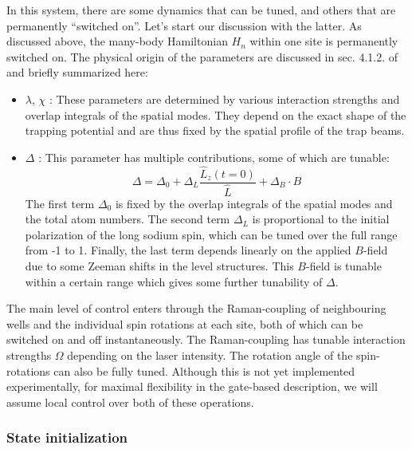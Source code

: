 \documentclass[a4paper, 10pt]{article}
\begin{document}
    In this system, there are some dynamics that can be tuned, and others that are permanently ``switched on''.
    Let's start our discussion with the latter. As discussed above, the many-body Hamiltonian $H_n$ within one site is permanently switched on.
    The physical origin of the parameters are discussed in sec. 4.1.2. of \cite{mil2020experimental} and briefly summarized here:
    
    \begin{itemize}
        \item $\lambda$, $\chi$ : These parameters are determined by various interaction strengths and overlap integrals of the spatial modes.
        They depend on the exact shape of the trapping potential and are thus fixed by the spatial profile of the trap beams.
        
        \item $\Delta$ : This parameter has multiple contributions, some of which are tunable:
        \begin{equation}
            \Delta = \Delta_0 + \Delta_L \frac{\hat{L}_z(t=0) }{\hat{L}} + \Delta_B \cdot B 
        \end{equation}
        The first term $\Delta_0$ is fixed by the overlap integrals of the spatial modes and the total atom numbers.
        The second term $\Delta_L$ is proportional to the initial polarization of the long sodium spin, which can be tuned over the full range from -1 to 1.
        Finally, the last term depends linearly on the applied $B$-field due to some Zeeman shifts in the level structures.
        This $B$-field is tunable within a certain range which gives some further tunability of $\Delta$.
        
        \end{itemize}
        
    The main level of control enters through the Raman-coupling of neighbouring wells and the individual spin rotations at each site, both of which can be switched on and off instantaneously. The Raman-coupling has tunable interaction strengths $\Omega$ depending on the laser intensity. The rotation angle of the spin-rotations can also be fully tuned. Although this is not yet implemented experimentally, for maximal flexibility in the gate-based description, we will assume local control over both of these operations.
    
    \subsubsection{State initialization}
        
\end{document}
